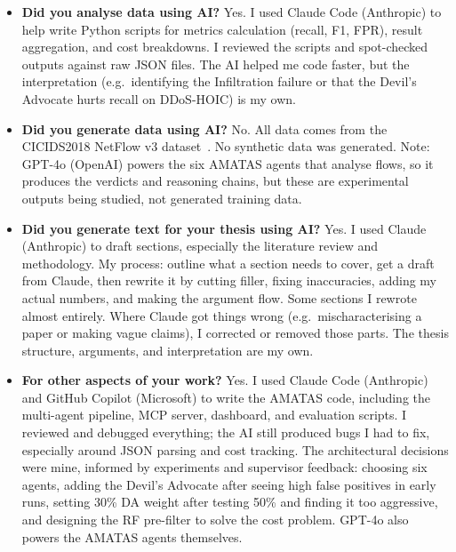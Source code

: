 \documentclass[12pt,openany,oneside,a4paper]{book}
\begin{document}
\begin{itemize}[leftmargin=1.5em, itemsep=0.5em]
  \item \textbf{Did you analyse data using AI?} Yes. I used Claude Code (Anthropic) to help write Python scripts for metrics calculation (recall, F1, FPR), result aggregation, and cost breakdowns. I reviewed the scripts and spot-checked outputs against raw JSON files. The AI helped me code faster, but the interpretation (e.g.\ identifying the Infiltration failure or that the Devil's Advocate hurts recall on DDoS-HOIC) is my own.

  \item \textbf{Did you generate data using AI?} No. All data comes from the CICIDS2018 NetFlow v3 dataset~\autocite{Sharafaldin2018}. No synthetic data was generated. Note: GPT-4o (OpenAI) powers the six AMATAS agents that analyse flows, so it produces the verdicts and reasoning chains, but these are experimental outputs being studied, not generated training data.

  \item \textbf{Did you generate text for your thesis using AI?} Yes. I used Claude (Anthropic) to draft sections, especially the literature review and methodology. My process: outline what a section needs to cover, get a draft from Claude, then rewrite it by cutting filler, fixing inaccuracies, adding my actual numbers, and making the argument flow. Some sections I rewrote almost entirely. Where Claude got things wrong (e.g.\ mischaracterising a paper or making vague claims), I corrected or removed those parts. The thesis structure, arguments, and interpretation are my own.

  \item \textbf{For other aspects of your work?} Yes. I used Claude Code (Anthropic) and GitHub Copilot (Microsoft) to write the AMATAS code, including the multi-agent pipeline, MCP server, dashboard, and evaluation scripts. I reviewed and debugged everything; the AI still produced bugs I had to fix, especially around JSON parsing and cost tracking. The architectural decisions were mine, informed by experiments and supervisor feedback: choosing six agents, adding the Devil's Advocate after seeing high false positives in early runs, setting 30\% DA weight after testing 50\% and finding it too aggressive, and designing the RF pre-filter to solve the cost problem. GPT-4o also powers the AMATAS agents themselves.
\end{itemize}

\newpage

\end{document}
